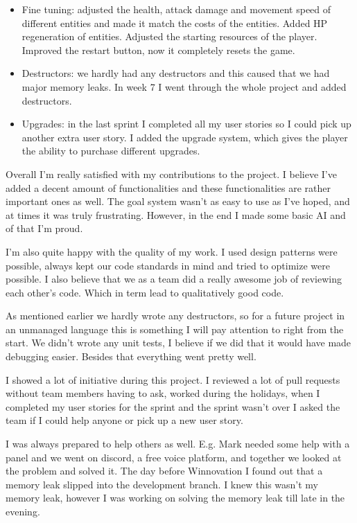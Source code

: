 \begin{itemize}
\item Fine tuning: adjusted the health, attack damage and movement speed of different entities and made it match the costs of the entities. Added HP regeneration of entities. Adjusted the starting resources of the player. Improved the restart button, now it completely resets the game.

\item Destructors: we hardly had any destructors and this caused that we had major memory leaks. In week 7 I went through the whole project and added destructors.

\item Upgrades: in the last sprint I completed all my user stories so I could pick up another extra user story. I added the upgrade system, which gives the player the ability to purchase different upgrades.

\end{itemize}

Overall I’m really satisfied with my contributions to the project. I believe I’ve added a decent amount of functionalities and these functionalities are rather important ones as well. The goal system wasn’t as easy to use as I’ve hoped, and at times it was truly frustrating. However, in the end I made some basic AI and of that I’m proud.

I’m also quite happy with the quality of my work. I used design patterns were possible, always kept our code standards in mind and tried to optimize were possible. I also believe that we as a team did a really awesome job of reviewing each other’s code. Which in term lead to qualitatively good code.

As mentioned earlier we hardly wrote any destructors, so for a future project in an unmanaged language this is something I will pay attention to right from the start. We didn’t wrote any unit tests, I believe if we did that it would have made debugging easier. Besides that everything went pretty well. 

I showed a lot of initiative during this project. I reviewed a lot of pull requests without team members having to ask, worked during the holidays, when I completed my user stories for the sprint and the sprint wasn’t over I asked the team if I could help anyone or pick up a new user story. 

I was always prepared to help others as well. E.g. Mark needed some help with a panel and we went on discord, a free voice platform, and together we looked at the problem and solved it. The day before Winnovation I found out that a memory leak slipped into the development branch. I knew this wasn’t my memory leak, however I was working on solving the memory leak till late in the evening. 

